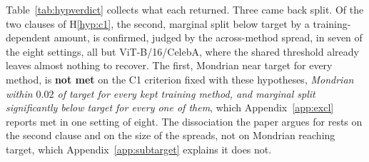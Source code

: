 \documentclass[pdflatex,sn-basic]{sn-jnl}%
\theoremstyle{thmstyleone}%
\begin{document}
\begin{appendices}
Table~\ref{tab:hypverdict} collects what each returned. Three came back split. Of the two clauses of
H\ref{hyp:c1}, the second, marginal split below target by a training-dependent amount, is confirmed,
judged by the across-method spread, in seven of the eight settings, all but ViT-B/16/CelebA, where the shared threshold already leaves
almost nothing to recover. The first, Mondrian near target for every method, is \textbf{not met} on the
C1 criterion fixed with these hypotheses, \emph{Mondrian within $0.02$ of target for every kept
training method, and marginal split significantly below target for every one of them}, which
Appendix~\ref{app:excl} reports met in one setting of eight. The dissociation the paper argues for
rests on the second clause and on the size of the spreads, not on Mondrian reaching target, which
Appendix~\ref{app:subtarget} explains it does not.


\end{appendices}
\end{document}
